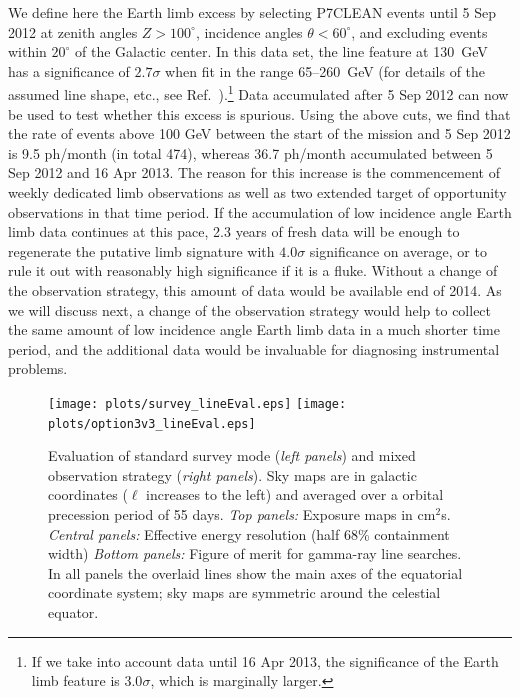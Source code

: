 \documentclass[aps,prd,superscriptaddress,nofootinbib,fixlfloat, 12pt]{revtex4-1}
\begin{document}
We define here the Earth limb excess by selecting P7CLEAN events until 5 Sep
2012 at zenith angles $Z>100^\circ$,
incidence angles $\theta<60^\circ$, and excluding events within $20^\circ$ of
the Galactic center. In this data set, the line feature at 130~GeV has a
significance of $2.7\sigma$ when
fit in the range 65--260~GeV (for details of the
assumed line shape, etc.,
see Ref.~\cite{finkbeiner_systematics}).\footnote{If we take into account data
  until 16 Apr 2013, the
significance of the Earth limb feature is $3.0\sigma$, which is marginally
larger.}
Data accumulated after 5 Sep 2012 can
now be used to test whether this excess is spurious. Using the above
cuts, we find that the rate of events above 100 GeV between the
start of the mission and 5 Sep 2012 is 9.5 ph/month (in total 474), whereas
36.7 ph/month accumulated between 5 Sep 2012 and 16 Apr 2013. The reason for
this increase is the commencement of weekly dedicated limb observations as
well as two extended
target of opportunity observations in that time period. If the accumulation of
low incidence angle Earth limb data continues at this pace, 2.3 years of fresh
data will be enough to regenerate the putative limb signature with $4.0\sigma$
significance on average, or to rule it out with reasonably high significance if it is a
fluke. Without a change of the observation strategy, this amount of data would
be available end of 2014. As we will discuss next, a change of the
observation strategy would help to collect the same amount of low incidence
angle Earth limb data in a much shorter time period, and the additional data
would be invaluable for diagnosing instrumental problems. 



\begin{figure}[t]
  \begin{center}
    \texttt{[image: plots/survey\_lineEval.eps]}
    \texttt{[image: plots/option3v3\_lineEval.eps]}
    \vspace{-0.5cm}
  \end{center}
  \caption{Evaluation of standard survey mode (\emph{left panels}) and mixed observation
    strategy (\emph{right panels}). Sky maps are in galactic coordinates ($\ell$ increases
    to the left) and averaged over a orbital precession period of 55 days.
    \emph{Top
      panels:} Exposure maps in cm$^2$s.
    \emph{Central panels:}
    Effective energy resolution (half 68\% containment width)
  \emph{Bottom panels:} Figure of merit for gamma-ray line searches. In all
  panels the overlaid lines show the main axes of the equatorial coordinate
  system; sky maps are symmetric around the celestial equator.}
  \label{fig:mollweide}
\end{figure}
\end{document}
